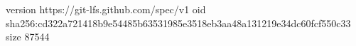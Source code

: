 version https://git-lfs.github.com/spec/v1
oid sha256:cd322a721418b9e54485b63531985e3518eb3aa48a131219e34dc60fcf550c33
size 87544
